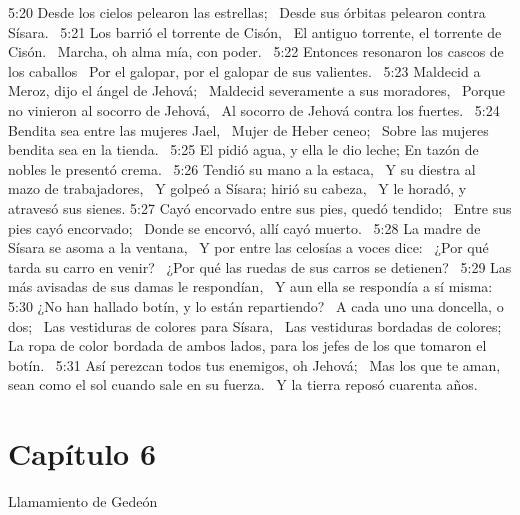 5:20 Desde los cielos pelearon las estrellas;  
Desde sus órbitas pelearon contra Sísara.  
5:21 Los barrió el torrente de Cisón,  
El antiguo torrente, el torrente de Cisón.  
Marcha, oh alma mía, con poder.  
5:22 Entonces resonaron los cascos de los caballos  
Por el galopar, por el galopar de sus valientes.  
5:23 Maldecid a Meroz, dijo el ángel de Jehová;  
Maldecid severamente a sus moradores,  
Porque no vinieron al socorro de Jehová,  
Al socorro de Jehová contra los fuertes.  
5:24 Bendita sea entre las mujeres Jael,  
Mujer de Heber ceneo;  
Sobre las mujeres bendita sea en la tienda.  
5:25 El pidió agua, y ella le dio leche; 
En tazón de nobles le presentó crema.  
5:26 Tendió su mano a la estaca,  
Y su diestra al mazo de trabajadores,  
Y golpeó a Sísara; hirió su cabeza,  
Y le horadó, y atravesó sus sienes. 
5:27 Cayó encorvado entre sus pies, quedó tendido;  
Entre sus pies cayó encorvado;  
Donde se encorvó, allí cayó muerto.  
5:28 La madre de Sísara se asoma a la ventana,  
Y por entre las celosías a voces dice:  
¿Por qué tarda su carro en venir?  
¿Por qué las ruedas de sus carros se detienen?  
5:29 Las más avisadas de sus damas le respondían,  
Y aun ella se respondía a sí misma:  
5:30 ¿No han hallado botín, y lo están repartiendo?  
A cada uno una doncella, o dos;  
Las vestiduras de colores para Sísara,  
Las vestiduras bordadas de colores;  
La ropa de color bordada de ambos lados, para los jefes de los que tomaron el botín.  
5:31 Así perezcan todos tus enemigos, oh Jehová;  
Mas los que te aman, sean como el sol cuando sale en su fuerza.  
Y la tierra reposó cuarenta años.  
\section*{Capítulo 6}
Llamamiento de Gedeón  

